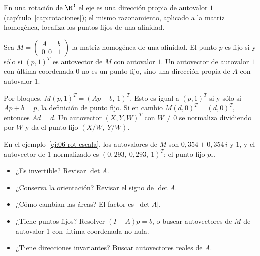 En una rotación de \(\R^3\) el eje es una dirección propia de autovalor \(1\)
(capítulo~\ref{cap:rotaciones}); el mismo razonamiento, aplicado a la matriz homogénea, localiza los
puntos fijos de una afinidad.

\begin{proposicion}\label{prop:06-fijo-autovector}
Sea \(M=\begin{pmatrix}A&b\\0\ \ 0&1\end{pmatrix}\) la matriz homogénea de una afinidad. El
punto \(p\) es fijo si y sólo si \((p,1)^T\) es autovector de \(M\) con autovalor \(1\). Un
autovector de autovalor \(1\) con última coordenada \(0\) no es un punto fijo, sino una
dirección propia de \(A\) con autovalor \(1\).
\end{proposicion}

\begin{demostracion}
Por bloques, \(M(p,1)^T=(Ap+b,\ 1)^T\). Esto es igual a \((p,1)^T\) si y sólo si \(Ap+b=p\),
la definición de punto fijo. Si en cambio \(M(d,0)^T=(d,0)^T\), entonces \(Ad=d\). Un
autovector \((X,Y,W)^T\) con \(W\neq0\) se normaliza dividiendo por \(W\) y da el punto fijo
\((X/W,\ Y/W)\).
\end{demostracion}

En el ejemplo~\ref{ej:06-rot-escala}, los autovalores de \(M\) son \(0{,}354\pm0{,}354\,i\)
y \(1\), y el autovector de \(1\) normalizado es \((0{,}293,\ 0{,}293,\ 1)^T\): el punto fijo
\(p_\ast\).

\begin{idea}
\begin{itemize}
  \item ¿Es invertible? Revisar \(\det A\).
  \item ¿Conserva la orientación? Revisar el signo de \(\det A\).
  \item ¿Cómo cambian las áreas? El factor es \(|\det A|\).
  \item ¿Tiene puntos fijos? Resolver \((I-A)p=b\), o buscar autovectores de \(M\) de
  autovalor \(1\) con última coordenada no nula.
  \item ¿Tiene direcciones invariantes? Buscar autovectores reales de \(A\).
\end{itemize}
\end{idea}

